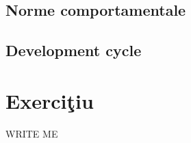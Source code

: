 \subsection{Norme comportamentale}


\subsection{Development cycle}




\section{Exerciţiu}


WRITE ME
